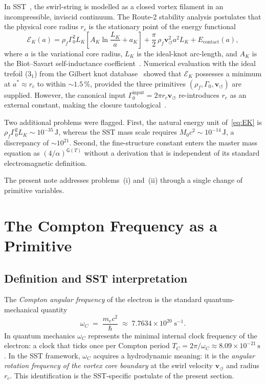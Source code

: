 \documentclass[11pt,a4paper]{article}
\newcommand{\rc}{r_c}
\newcommand{\vswirl}{\mathbf{v}_{\scriptscriptstyle\boldsymbol{\circlearrowleft}}}
\newcommand{\rhof}{\rho_{\!f}}
\newcommand{\GammaZ}{\Gamma_0}
\newcommand{\omC}{\omega_C}
\newcommand{\EK}{\mathcal{E}_K}
\newcommand{\AK}{A_K}
\begin{document}
In SST~\cite{IskandaraniCanon078}, the swirl-string is modelled as a
closed vortex filament in an incompressible, inviscid continuum.
The Route-2 stability analysis postulates that the physical core radius
$\rc$ is the stationary point of the energy functional
\begin{equation}
  \EK(a)
  = \rhof\GammaZ^2 L_K
    \!\left[A_K\ln\!\frac{L_K}{a}+a_K\right]
  + \frac{\pi}{2}\,\rhof\vswirl^2 a^2 L_K
  + E_{\mathrm{contact}}(a),
  \label{eq:EK}
\end{equation}
where $a$ is the variational core radius, $L_K$ is the ideal-knot
arc-length, and $\AK$ is the Biot--Savart self-inductance
coefficient~\cite{Saffman1992}.  Numerical evaluation with the ideal
trefoil ($3_1$) from the Gilbert knot database~\cite{Gilbert2016}
showed that $\EK$ possesses a minimum at $a^*\approx\rc$ to within
$\sim 1.5\,\%$, provided the three primitives $(\rhof,\GammaZ,\vswirl)$
are supplied.  However, the canonical input
$\GammaZ^{\mathrm{input}}=2\pi\rc\vswirl$
re-introduces $\rc$ as an external constant, making the closure
tautological~\cite{ChatGPTAudit2025}.

Two additional problems were flagged.  First, the natural energy unit
of~\eqref{eq:EK} is $\rhof\GammaZ^2 L_K\sim 10^{-35}\,\mathrm{J}$,
whereas the SST mass scale requires $M_0 c^2\sim 10^{-14}\,\mathrm{J}$,
a discrepancy of $\sim 10^{21}$.  Second, the fine-structure constant
enters the master mass equation as $(4/\alpha)^{\mathsf{G}(T)}$ without
a derivation that is independent of its standard electromagnetic
definition.

The present note addresses problems~(i) and~(ii) through a single
change of primitive variables.

\section{The Compton Frequency as a Primitive}

\subsection{Definition and SST interpretation}

The \emph{Compton angular frequency} of the electron is the standard
quantum-mechanical quantity~\cite{MohrTaylor2016}
\begin{equation}
  \omC \;=\; \frac{m_e c^2}{\hbar}
  \;\approx\; 7.7634\times10^{20}\;\mathrm{s}^{-1}.
  \label{eq:omC_def}
\end{equation}
In quantum mechanics $\omC$ represents the minimal internal clock
frequency of the electron: a clock that ticks once per Compton
period $T_C=2\pi/\omC\approx 8.09\times10^{-21}\,\mathrm{s}$
\cite{Hestenes1990zitterbewegung}.  In the SST framework,
$\omC$ acquires a hydrodynamic meaning: it is the
\emph{angular rotation frequency of the vortex core boundary}
at the swirl velocity $\vswirl$ and radius $\rc$.  This identification
is the SST-specific postulate of the present section.
\end{document}
